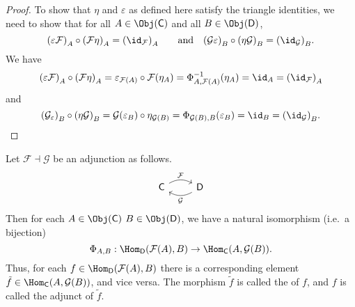 \documentclass[notes.tex]{subfiles}
\begin{document}
\begin{proof}
  To show that $\eta$ and $\varepsilon$ as defined here satisfy the triangle identities, we need to show that for all $A \in \Obj(\mathsf{C})$ and all $B \in \Obj(\mathsf{D})$,
  \begin{equation*}
    {(\varepsilon\mathcal{F})}_{A} \circ {(\mathcal{F}\eta)}_{A} = {(\id_{\mathcal{F}})}_{A}\qquad\text{and}\quad {(\mathcal{G}\varepsilon)}_{B} \circ {(\eta\mathcal{G})}_{B} = {(\id_{\mathcal{G}})}_{B}.
  \end{equation*}
  We have
  \begin{equation*}
    {(\varepsilon\mathcal{F})}_{A} \circ {(\mathcal{F}\eta)}_{A} = \varepsilon_{\mathcal{F}(A)} \circ \mathcal{F}(\eta_{A}) = \Phi^{-1}_{A, \mathcal{F}(A)}(\eta_{A}) = \id_{A} = {(\id_{\mathcal{F}})}_{A}
  \end{equation*}
  and
  \begin{equation*}
    {(\mathcal{G}_{\varepsilon})}_{B} \circ {(\eta\mathcal{G})}_{B} = \mathcal{G}(\varepsilon_{B}) \circ \eta_{\mathcal{G}(B)} = \Phi_{\mathcal{G}(B), B}(\varepsilon_{B}) = \id_{B} = {(\id_{\mathcal{G}})}_{B}.
  \end{equation*}
\end{proof}


\begin{definition}[adjunct]
  \label{def:adjunct}
  Let $\mathcal{F} \dashv \mathcal{G}$ be an adjunction as follows.
  \begin{equation*}
    \begin{tikzcd}
      \mathsf{C}
      \arrow[r, bend left, rightarrow, "\mathcal{F}"]
      & \mathsf{D}
      \arrow[l, bend left, rightarrow, "\mathcal{G}"]
    \end{tikzcd}
  \end{equation*}
  Then for each $A \in \Obj(\mathsf{C})$ $B \in \Obj(\mathsf{D})$, we have a natural isomorphism (i.e.\ a bijection)
  \begin{equation*}
    \Phi_{A, B}: \Hom_{\mathsf{D}}(\mathcal{F}(A), B) \to \Hom_{\mathsf{C}}(A, \mathcal{G}(B)).
  \end{equation*}
  Thus, for each $f \in \Hom_{\mathsf{D}}(\mathcal{F}(A), B)$ there is a corresponding element $\tilde{f} \in \Hom_{\mathsf{C}}(A, \mathcal{G}(B))$, and vice versa. The morphism $\tilde{f}$ is called the  of $f$, and $f$ is called the adjunct of $\tilde{f}$.
\end{definition}
\end{document}
